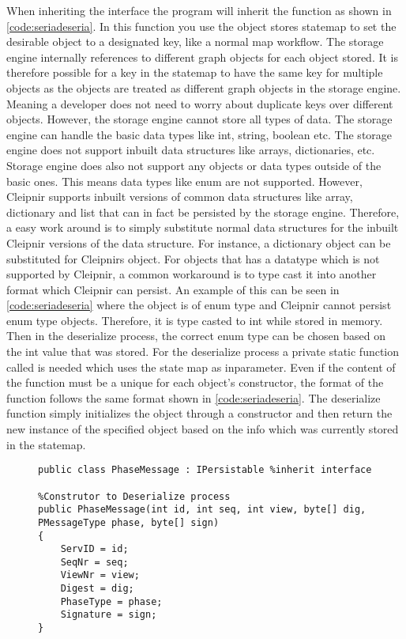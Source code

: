 When inheriting the  interface the program will inherit the  function as shown in \autoref{code:seriadeseria}. In this function you use the object stores statemap to set the desirable object to a designated key, like a normal map workflow. The storage engine internally references to different graph objects for each object stored. It is therefore possible for a key in the statemap to have the same key for multiple objects as the objects are treated as different graph objects in the storage engine. Meaning a developer does not need to worry about duplicate keys over different objects. However, the storage engine cannot store all types of data. The storage engine can handle the basic data types like int, string, boolean etc. The storage engine does not support inbuilt data structures like arrays, dictionaries, etc. Storage engine does also not support any objects or data types outside of the basic ones. This means data types like enum are not supported. However, Cleipnir supports inbuilt versions of common data structures like array, dictionary and list that can in fact be persisted by the storage engine. Therefore, a easy work around is to simply substitute normal data structures for the inbuilt Cleipnir versions of the data structure. For instance, a dictionary object can be substituted for Cleipnirs  object. For objects that has a datatype which is not supported by Cleipnir, a common workaround is to type cast it into another format which Cleipnir can persist. An example of this can be seen in \autoref{code:seriadeseria} where the object  is of enum type and Cleipnir cannot persist enum type objects. Therefore, it is type casted to int while stored in memory. Then in the deserialize process, the correct enum type can be chosen based on the int value that was stored. For the deserialize process a private static function called  is needed which uses the state map as inparameter. Even if the content of the function must be a unique for each object’s constructor, the format of the function follows the same format shown in \autoref{code:seriadeseria}. The deserialize function simply initializes the object through a constructor and then return the new instance of the specified object based on the info which was currently stored in the statemap.


\begin{figure}[H]
	\centering
	\lstset{style=sharpc}
	\begin{lstlisting}[label = code:interfaceexample, caption=Persistent initialize process, captionpos=b, basicstyle=\scriptsize]
public class PhaseMessage : IPersistable %inherit interface
		
%Construtor to Deserialize process
public PhaseMessage(int id, int seq, int view, byte[] dig, PMessageType phase, byte[] sign)
{
    ServID = id;
    SeqNr = seq;
    ViewNr = view;
    Digest = dig;
    PhaseType = phase;
    Signature = sign;
}
	\end{lstlisting}
\end{figure}

